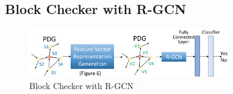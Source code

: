 


\subsection{ Block Checker with R-GCN}
\label{model:sec}

\begin{figure}[t]
	\centering
	\includegraphics[width=3.4in]{xblock.png}
	\caption{ Block Checker with R-GCN}
	\label{fig:gcn}	
\end{figure}

